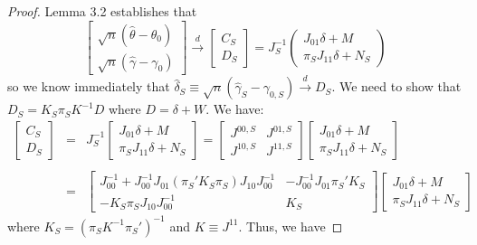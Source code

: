 \documentclass[12pt]{article}
\theoremstyle{definition}
\begin{document}
\begin{proof}
Lemma 3.2 establishes that
	$$
	\left[\begin{array}{c}
		\sqrt{n} (\hat{\theta} - \theta_0)\\
		\sqrt{n} (\hat{\gamma} - \gamma_0)
\end{array}\right]\overset{d}{\rightarrow} 
	\left[\begin{array}{c}
		C_S\\
		D_S
	\end{array}\right] = J_S^{-1}
	\left(\begin{array}{c}
		J_{01}\delta + M\\
		\pi_S J_{11}\delta + N_S 
	\end{array}\right)$$
so we know immediately that $\hat{\delta}_S \equiv \sqrt{n} (\hat{\gamma}_S - \gamma_{0,S})\overset{d}{\rightarrow} D_S$. We need to show that $D_S = K_S\pi_S K^{-1}D$ where $D = \delta + W$. We have:
	\begin{eqnarray*}
		\left[\begin{array}{c}
		C_S\\
		D_S
	\end{array}\right] &=& J_S^{-1}
	\left[\begin{array}{c}
		J_{01}\delta + M\\
		\pi_S J_{11}\delta + N_S 
	\end{array}\right] = \left[\begin{array}{cc}
				J^{00,S}&J^{01,S}\\
				J^{10,S}&J^{11,S}	
		\end{array}\right] \left[\begin{array}{c}
		J_{01}\delta + M\\
		\pi_S J_{11}\delta + N_S 
	\end{array}\right] \\ \\
	&=& \left[\begin{array}{cc}
				J_{00}^{-1} + J_{00}^{-1}J_{01}\left(\pi_S'K_S\pi_S \right)J_{10}J_{00}^{-1}&-J_{00}^{-1}J_{01}\pi_S'K_S\\
				-K_S \pi_S J_{10}J_{00}^{-1}&K_S	
		\end{array}\right] \left[\begin{array}{c}
		J_{01}\delta + M\\
		\pi_S J_{11}\delta + N_S 
	\end{array}\right] 
	\end{eqnarray*}
where $K_S = \left(\pi_S K^{-1} \pi_S'\right)^{-1}$ and $K\equiv J^{11}$. Thus, we have

\end{proof}
\end{document}

